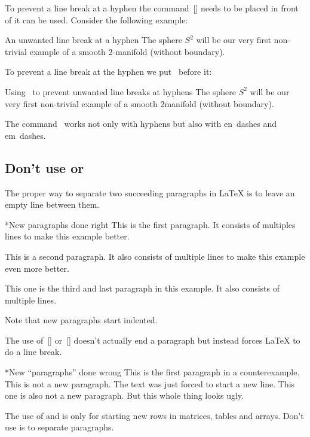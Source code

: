 To prevent a line break at a hyphen the command~[\comname] needs to be placed in front of it can be used.
Consider the following example:
\begin{showlatex}{An unwanted line break at a hyphen}
The sphere $S^2$ will be our very first non-trivial example of a smooth $2$-manifold (without boundary).
\end{showlatex}
To prevent a line break at the hyphen we put~ before it:
\begin{showlatex}{Using~ to prevent unwanted line breaks at hyphens}
The sphere $S^2$ will be our very first non-trivial example of a smooth $2${\nbd}manifold (without boundary).
\end{showlatex}
The command~ works not only with hyphens but also with en~dashes and em~dashes.



\subsection{Don’t use \comtitle{\tbs} or }

The proper way to separate two succeeding paragraphs in {\LaTeX} is to leave an empty line between them.
\begin{showlatex}*{New paragraphs done right}
This is the first paragraph.
It consists of multiples lines to make this example better.

This is a second paragraph.
It also consists of multiple lines to make this example even more better.

This one is the third and last paragraph in this example.
It also consists of multiple lines.
\end{showlatex}
Note that new paragraphs start indented.

The use of~\comname{\tbs}\massindex{\tbs}[\comname] or~[\comname] doesn’t actually end a paragraph but instead forces {\LaTeX} to do a line break.
\begin{showlatex}*{New \enquote{paragraphs} done wrong}
This is the first paragraph in a counterexample.\\
This is not a new paragraph.
The text was just forced to start a new line.\newline
This one is also not a new paragraph.
But this whole thing looks ugly.
\end{showlatex}
The use of \comname{\tbs} and  is only for starting new rows in matrices, tables and arrays.
Don’t use is to separate paragraphs.



